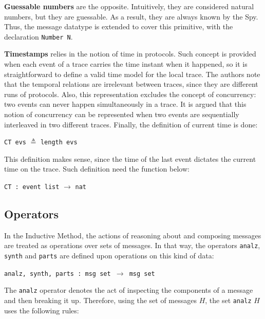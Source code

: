 \textbf{Guessable numbers} are the opposite. Intuitively, they are considered natural numbers, but they are guessable. As a result, they are always known by the Spy. Thus, the message datatype is extended to cover this primitive, with the declaration \texttt{Number N}.

\textbf{Timestamps} relies in the notion of time in protocols. Such concept is provided when each event of a trace carries the time instant when it happened, so it is straightforward to define a valid time model for the local trace. The authors note that the temporal relations are irrelevant between traces, since they are different runs of protocols. Also, this representation excludes the concept of concurrency: two events can never happen simultaneously in a trace. It is argued that this notion of concurrency can be represented when two events are sequentially interleaved in two different traces. Finally, the definition of current time is done:

\begin{center}
  \texttt{CT evs} $\triangleq$ \texttt{length evs}
\end{center}

This definition makes sense, since the time of the last event dictates the current time on the trace. Such definition need the function below:

\begin{center}
  \texttt{CT : event list} $\longrightarrow$ \texttt{nat}
\end{center}


\subsection{Operators}
In the Inductive Method, the actions of reasoning about and composing messages are treated as operations over sets of messages. In that way, the operators \texttt{analz}, \texttt{synth} and \texttt{parts} are defined upon operations on this kind of data:

\begin{center}
  \texttt{analz, synth, parts : msg set $\longrightarrow$ msg set}
\end{center}

The \texttt{analz} operator denotes the act of inspecting the components of a message and then breaking it up. Therefore, using the set of messages $H$, the set \texttt{analz} $H$ uses the following rules:

